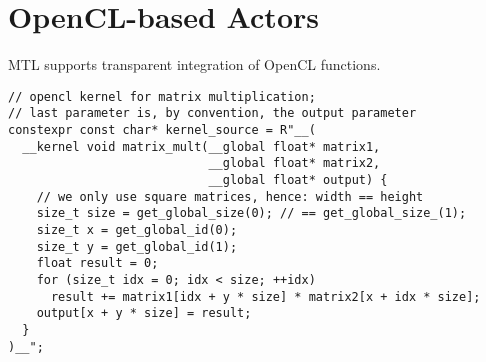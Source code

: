 \section{OpenCL-based Actors}

MTL supports transparent integration of OpenCL functions.


\begin{lstlisting}
// opencl kernel for matrix multiplication;
// last parameter is, by convention, the output parameter
constexpr const char* kernel_source = R"__(
  __kernel void matrix_mult(__global float* matrix1,
                            __global float* matrix2,
                            __global float* output) {
    // we only use square matrices, hence: width == height
    size_t size = get_global_size(0); // == get_global_size_(1);
    size_t x = get_global_id(0);
    size_t y = get_global_id(1);
    float result = 0;
    for (size_t idx = 0; idx < size; ++idx)
      result += matrix1[idx + y * size] * matrix2[x + idx * size];
    output[x + y * size] = result;
  }
)__";
\end{lstlisting}


